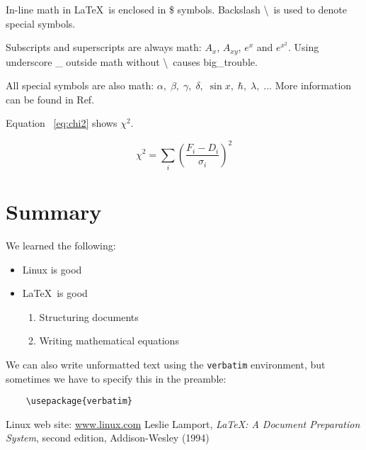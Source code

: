 \documentclass[a4paper]{article}
\begin{document}
	In-line math in \LaTeX \ is enclosed in \$ symbols. Backslash \textbackslash \ is used to denote special symbols.

	Subscripts and superscripts are always math: $A_x$, $A_{xy}$, $e^x$ and $e^{x^2}$. Using underscore \_ outside math without \textbackslash \ causes big\_trouble.

	All special symbols are also math: $\alpha,\; \beta,\; \gamma,\; \delta,\; \sin x,\; \hbar,\; \lambda,\; \ldots$ More information can be found in Ref.~\cite{latex}

	Equation ~\ref{eq:chi2} shows $\chi^2$.

	\begin{equation}
	\label{eq:chi2}
		\chi^2 = \sum_i \left(\frac{F_i-D_i}{\sigma_i}\right)^2
	\end{equation}

\section{Summary}
\label{sec:sum}

	We learned the following: 

	\begin{itemize}
		\item Linux is good
		\item \LaTeX \ is good
		\begin{enumerate}
			\item Structuring documents
			\item Writing mathematical equations
		\end{enumerate}
	\end{itemize}

	We can also write unformatted text using the \texttt{verbatim} environment, but sometimes we have to specify this in the preamble:
	
	\begin{verbatim}
	\usepackage{verbatim}
	\end{verbatim}

\begin{thebibliography}{99}
	 Linux web site: \url{www.linux.com}
	 Leslie Lamport, \textit{LaTeX: A Document Preparation System}, second edition, Addison-Wesley (1994)
\end{thebibliography}
\end{document}
